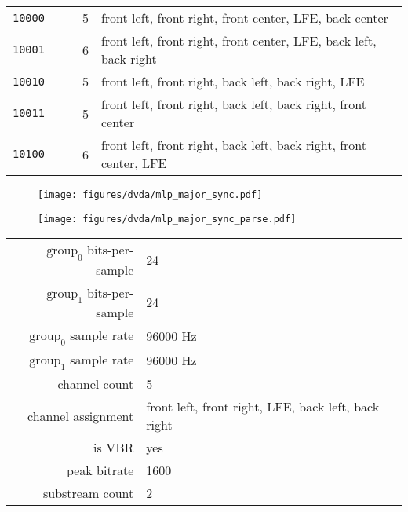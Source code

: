 \begin{tiny}
\begin{tabular}{|c|r|r|r|l|}
    \texttt{10000} & & & 5 & front left, front right, front center, LFE, back center \\
    \texttt{10001} & & & 6 & front left, front right, front center, LFE, back left, back right \\
    \texttt{10010} & & & 5 & front left, front right, back left, back right, LFE \\
    \texttt{10011} & & & 5 & front left, front right, back left, back right, front center \\
    \texttt{10100} & & & 6 & front left, front right, back left, back right, front center, LFE \\
    \hline
  \end{tabular}
\end{tiny}

\clearpage

\begin{figure}[h]
  \texttt{[image: figures/dvda/mlp\_major\_sync.pdf]}
\end{figure}
\begin{figure}[h]
  \texttt{[image: figures/dvda/mlp\_major\_sync\_parse.pdf]}
\end{figure}
{
\begin{tabular}{rl}
  $\text{group}_0$ bits-per-sample & 24 \\
  $\text{group}_1$ bits-per-sample & 24 \\
  $\text{group}_0$ sample rate & 96000 Hz \\
  $\text{group}_1$ sample rate & 96000 Hz \\
  channel count & 5 \\
  channel assignment & front left, front right, LFE, back left, back right \\
  is VBR & yes \\
  peak bitrate & 1600 \\
  substream count & 2 \\
\end{tabular}
}

\clearpage

